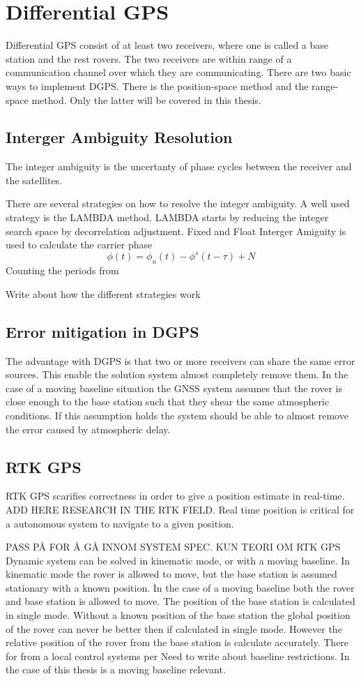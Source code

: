 \section{Differential GPS}
Differential GPS consist of at least two receivers, where one is called a base station and the rest rovers. The two receivers are within range of a communication channel over which they are communicating. There are two basic ways to implement DGPS. There is the position-space method and the range-space method. Only the latter will be covered in this thesis.
\subsection{Interger Ambiguity Resolution}
The integer ambiguity is the uncertanty of phase cycles between the receiver and the satellites.

There are several strategies on how to resolve the integer ambiguity. A well used strategy is the LAMBDA method. LAMBDA starts by reducing the integer search space by decorrelation adjustment.
Fixed and Float
Interger Amiguity is used to calculate the carrier phase
\begin{equation}
\phi(t) = \phi_u(t)-\phi^s(t-\tau)+N
\end{equation}
Counting the periods from

Write about how the different strategies work
\subsection{Error mitigation in DGPS} \label{ss: Error mitigation DGPS}
The advantage with DGPS is that two or more receivers can share the same error sources. This enable the solution system almost completely remove them.
In the case of a moving baseline situation the GNSS system assumes that the rover is close enough to the base station such that they shear the same atmospheric conditions. If this assumption holds the system should be able to almost remove the error caused by atmospheric delay.


\subsection{RTK GPS}
RTK GPS scarifies correctness in order to give a position estimate in real-time. ADD HERE RESEARCH IN THE RTK FIELD. Real time position is critical for a autonomous system to navigate to a given position. 


PASS PÅ FOR Å GÅ INNOM SYSTEM SPEC. KUN TEORI OM RTK GPS
Dynamic system can be solved in kinematic mode, or with a moving baseline. In kinematic mode the rover is allowed to move, but the base station is assumed stationary with a known position. In the case of a moving baseline both the rover and base station is allowed to move. The position of the base station is calculated in single mode. Without a known position of the base station the global position of the rover can never be better then if calculated in single mode. However the relative position of the rover from the base station is calculate accurately. There for from a local control systems per
Need to write about baseline restrictions. In the case of this thesis is a moving baseline relevant.

